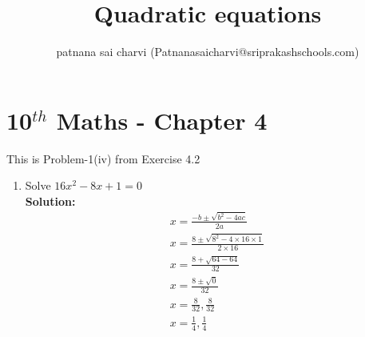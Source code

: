 \documentclass[12pt]{article}
\title{Quadratic equations}
\author{patnana sai charvi (Patnanasaicharvi@sriprakashschools.com)}
\newcommand{\solution}{\noindent \textbf{Solution: }}
\begin{document}
\maketitle
\section*{10$^{th}$ Maths - Chapter 4}
This is Problem-1(iv) from Exercise 4.2
\begin{enumerate}
\item Solve ${{16}x^2-{8} x +{1} = 0}$\\
\solution\\
\begin{align}
x=\frac{-b\pm\sqrt{{b^2-4ac}}}{2a}\\
x=\frac{8\pm\sqrt{8^2-4 \times 16\times1}}{2 \times 16}\\                                                        
x=\frac{8+\sqrt{64-64}}{32}\\
x=\frac{8\pm\sqrt{0}}{32}\\
x=\frac{8}{32}, \frac{8}{32}\\
x=\frac{1}{4}, \frac{1}{4}\\
\end{align}
\end{enumerate}
\end{document}
